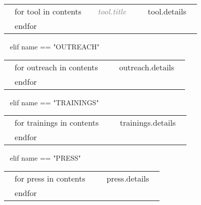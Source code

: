 \begin{minipage}{\textwidth}
\begin{tabular}{ @{} p{32mm} p{135mm} @{} }
  ~{ for tool in contents }~
  \small \textcolor{gray}{{\emph{~{{ tool.title }}~}}} & {\small ~{{ tool.details }}~} \\
  ~{ endfor }~
\end{tabular}


~{ elif name == "OUTREACH" }~

\begin{tabular}{ @{} p{32mm} p{135mm} @{} }
  ~{ for outreach in contents }~
  \small \textcolor{gray}{{\emph{ }}} & {\small ~{{ outreach.details }}~} \\
  ~{ endfor }~
\end{tabular}


~{ elif name == "TRAININGS" }~

\begin{tabular}{ @{} p{32mm} p{135mm} @{} }
  ~{ for trainings in contents }~
  \small \textcolor{gray}{{\emph{ }}} & {\small ~{{ trainings.details }}~} \\
  ~{ endfor }~
\end{tabular}

~{ elif name == "PRESS" }~

\begin{tabular}{ @{} p{32mm} p{135mm} @{} }
  ~{ for press in contents }~
  \small \textcolor{gray}{{\emph{ }}} & {\small ~{{ press.details }}~} \\
  ~{ endfor }~
\end{tabular}



\end{minipage}
